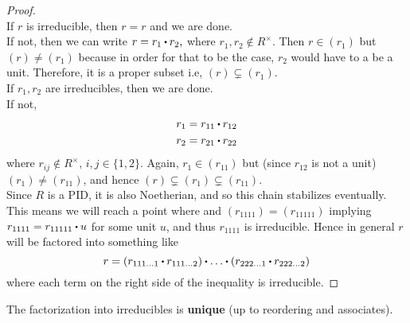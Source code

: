 \documentclass[../Main.tex]{subfiles}
\begin{document}
\begin{proof}~\\
	If $r$ is irreducible, then $r=r$ and we are done.\\
	If not, then we can write $r=r_1\rdot r_2,$ where $r_1,r_2\notin R^\times$. Then $r\in (r_1)$ but $(r)\ne (r_1)$ because in order for that to be the case, $r_2$ would have to a be a unit. Therefore, it is a proper subset i.e, $(r)\subsetneq (r_1)$.\\
	If $r_1,r_2$ are irreducibles, then we are done.\\
	If not, 
	\begin{align*}
	r_1=r_{11}\rdot r_{12}\\
	r_2=r_{21}\rdot r_{22}
	\end{align*}
	where $r_{ij}\notin R^\times,\, i,j\in \{1,2\}$. Again, $r_1\in (r_{11})$ but (since $r_{12}$ is not a unit)  $(r_1)\ne (r_{11})$, and hence $(r)\subsetneq (r_1)\subsetneq (r_{11})$.\\
	Since $R$ is a PID, it is also Noetherian, and so this chain stabilizes eventually. This means we will reach a point where and $(r_{1111}) =(r_{11111})$ implying $r_{1111}=r_{11111}\rdot u$ for some unit $u$, and thus $r_{1111}$ is irreducible. Hence in general $r$ will be factored into something like
	\[r=(r_{111\dots1}\rdot r_{111\dots 2})\rdot \dots \rdot (r_{222\dots1}\rdot r_{222\dots 2})\]
	where each term on the right side of the inequality is irreducible.
\end{proof}
\begin{lem}[title = Uniqueness of product of irreducibles in PID ]
	The factorization into irreducibles is \textbf{unique} (up to reordering and associates).
\end{lem}
\end{document}

